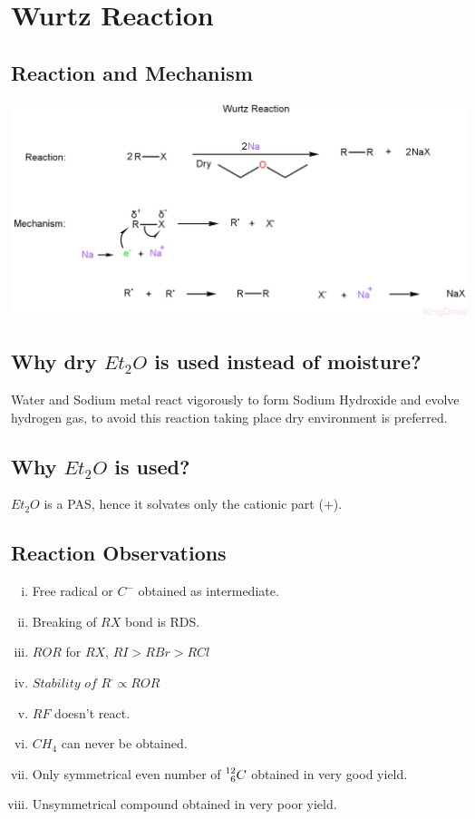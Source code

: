 \documentclass{article}
\begin{document}
\section{Wurtz Reaction}

\subsection{Reaction and Mechanism}
\begin{center}

    \includegraphics[scale=0.25]{WurtzReaction(1)_1722164749564.JPEG}
\end{center}

\subsection{Why dry $Et_{2}O$ is used instead of moisture?}
Water and Sodium metal react vigorously to form Sodium Hydroxide and evolve hydrogen gas, to avoid this reaction taking place dry environment is preferred.
\subsection{Why $Et_{2}O$ is used?}
$Et_{2}O$ is a PAS, hence it solvates only the cationic part (+).

\subsection{Reaction Observations}
\begin{enumerate}[i.]
    \item Free radical or $C^-$ obtained as intermediate.
    \item Breaking of $RX$ bond is RDS.
    \item $ROR$ for $RX$, $RI > RBr> RCl$
    \item $\textit{Stability of } R^\cdot \propto ROR $
    \item $RF$ doesn't react.
    \item $CH_{4}$ can never be obtained.
    \item Only symmetrical even number of $\prescript{12}{6}{C}$ obtained in very good yield.
    \item Unsymmetrical compound obtained in very poor yield.
\end{enumerate}
\end{document}
